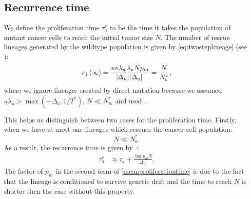 \documentclass[12pt]{extarticle}
\begin{document}
\begin{appendices}
\section{Recurrence time}
We define the proliferation time $\tau_a^r$  to be the time it takes the population of mutant cancer cells to reach the initial tumor size $N$. The number of rescue lineages generated by the wildtype population is given by  \cref{eq:twosteplineage} (see ):
\begin{equation*}
r_1\left(\infty\right)=\frac{uv\lambda_w\lambda_aNp_m}{\abs{\Delta_w}\abs{\Delta_a}}=\frac{N}{N_a^*},
\end{equation*}
where we ignore lineages created by direct mutation because we assumed $u\lambda_a > \max{(-\Delta_a, 1/T^*)}$, $N\ll N_m^*$ and used .

This helps us distinguish between two cases for the proliferation time. Firstly, when we have at most one lineages which rescues the cancer cell population:
\begin{equation*}
N\ll N_a^*.
\end{equation*}
As a result, the recurrence time is given by~\citep{avanzini2019cancer}:
\begin{align}\label{meanproliferationtime}
\tau_a^r&\approx\tau_a+\frac{\log p_mN}{\Delta_m}.
\end{align}
The factor of $p_m$ in the second term of \cref{meanproliferationtime} is due to the fact that the lineage is conditioned to survive genetic drift and the time to reach $N$ is shorter then the case without this property. 


\end{appendices}
\end{document}
